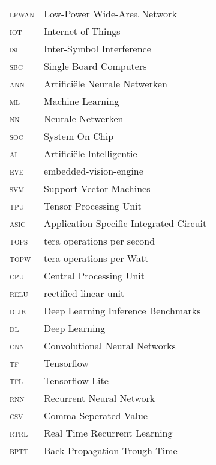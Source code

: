 \begin{longtable}{ll}
\textsc{lpwan}	& Low-Power Wide-Area Network\\
\textsc{iot}	& Internet-of-Things\\
\textsc{isi}	& Inter-Symbol Interference\\
\textsc{sbc}	& Single Board Computers\\
\textsc{ann}	& Artifici\"ele Neurale Netwerken\\
\textsc{ml}	& Machine Learning\\
\textsc{nn}	& Neurale Netwerken\\
\textsc{soc}	& System On Chip\\
\textsc{ai}	& Artifici\"ele Intelligentie\\
\textsc{eve}	& embedded-vision-engine\\
\textsc{svm}	& Support Vector Machines\\
\textsc{tpu}	& Tensor Processing Unit\\
\textsc{asic}	& Application Specific Integrated Circuit\\
\textsc{tops}	& tera operations per second\\
\textsc{topw}	& tera operations per Watt\\
\textsc{cpu}	& Central Processing Unit\\
\textsc{relu}	& rectified linear unit\\
\textsc{dlib}	& Deep Learning Inference Benchmarks\\
\textsc{dl}	& Deep Learning\\
\textsc{cnn}	& Convolutional Neural Networks\\
\textsc{tf}	& Tensorflow\\
\textsc{tfl}	& Tensorflow Lite\\
\textsc{rnn}	& Recurrent Neural Network\\
\textsc{csv}	& Comma Seperated Value\\
\textsc{rtrl}	& Real Time Recurrent Learning\\
\textsc{bptt}	& Back Propagation Trough Time\\


\end{longtable}


